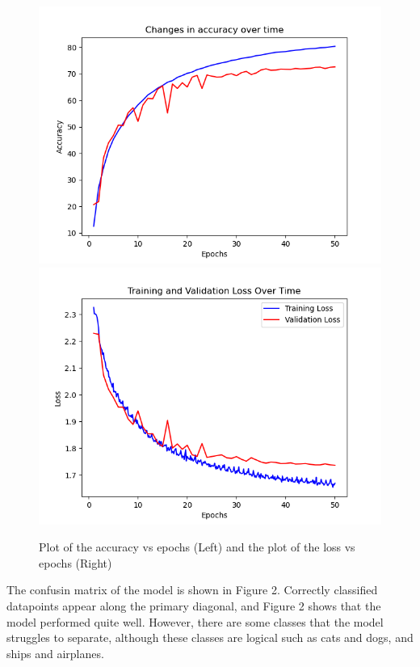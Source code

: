 \documentclass[letterpaper, 12pt]{article}
\begin{document}
\begin{figure}[H]
\centering
\includegraphics[scale = 0.5]{accuracy}
\includegraphics[scale = 0.5]{loss}
\caption{Plot of the accuracy vs epochs (Left) and the plot of the loss vs epochs (Right)}
\end{figure}

The confusin matrix of the model is shown in Figure 2. Correctly classified datapoints appear along the primary diagonal, and Figure 2 shows that the model performed quite well. However, there are some classes that the model struggles to separate, although these classes are logical such as cats and dogs, and ships and airplanes.
\end{document}
